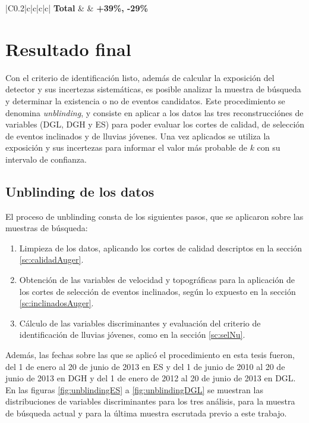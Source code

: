 \begin{table}[ht!]
\begin{tabular}{|C{0.2\textwidth}|c|c|c|c|}
		\hline
		\hline
		{\bf Total}                     &   {}  & {\bf +39\%, -29\%}         \\
		\hline
		\end{tabular}
		\caption{Resumen de las fuentes de error sistemático consideradas en este trabajo. Luego de obtener la estimación debida a cada fuebte para cada canal se combinaron utilizando la ecuación \ref{eq:sistErr03}, lo que se muestra en la última columna. Por último el error en la exposición total se obtuvo sumando en cuadratura los valores expuestos en la última columna.}
		\label{tab:sist}
	\end{table}

\section{Resultado final}

Con el criterio de identificaci\'on listo, adem\'as de calcular la exposici\'on del detector y sus incertezas sistem\'aticas, es posible analizar la muestra de b\'usqueda y determinar la existencia o no de eventos candidatos.
Este procedimiento se denomina \emph{unblinding}, y consiste en aplicar a los datos las tres reconstrucci\'ones de variables (DGL, DGH y ES) para poder evaluar los cortes de calidad, de selecci\'on de eventos inclinados y de lluvias j\'ovenes.
Una vez aplicados se utiliza la exposici\'on y sus incertezas para informar el valor m\'as probable de $k$ con su intervalo de confianza.
	
	\subsection{Unblinding de los datos}
	
	El proceso de unblinding consta de los siguientes pasos, que se aplicaron sobre las muestras de b\'usqueda:
	\begin{enumerate}
	 \item Limpieza de los datos, aplicando los cortes de calidad descriptos en la secci\'on \ref{sc:calidadAuger}.
	 \item Obtenci\'on de las variables de velocidad y topogr\'aficas para la aplicaci\'on de los cortes de selecci\'on de eventos inclinados, seg\'un lo expuesto en la secci\'on \ref{sc:inclinadosAuger}.
	 \item C\'alculo de las variables discriminantes y evaluaci\'on del criterio de identificaci\'on de lluvias j\'ovenes, como en la secci\'on \ref{sc:selNu}.
	\end{enumerate}
	Adem\'as, las fechas sobre las que se aplic\'o el procedimiento en esta tesis fueron, del 1 de enero al 20 de junio de 2013 en ES y del 1 de junio de 2010 al 20 de junio de 2013 en DGH y del 1 de enero de 2012 al 20 de junio de 2013 en DGL.
	En las figuras \ref{fig:unblindingES} a \ref{fig:unblindingDGL} se muestran las distribuciones de variables discriminantes para los tres an\'alisis, para la muestra de b\'usqueda actual y para la \'ultima muestra escrutada previo a este trabajo.
	
